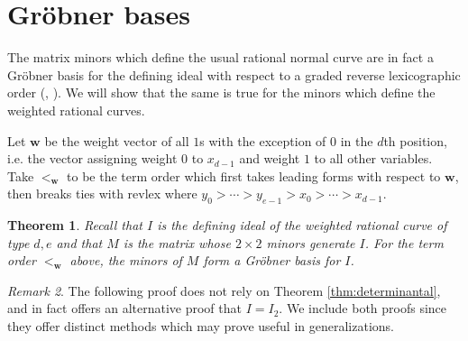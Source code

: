 \documentclass[12pt,reqno]{amsart}
\newtheorem{theorem}{Theorem}[section]
\theoremstyle{definition}
\theoremstyle{remark}
\newtheorem{remark}[theorem]{Remark}
\newcommand{\bfw}{{\mathbf{w}}}
\begin{document}
\section{Gr\"obner bases}\label{sec:GB}

The matrix minors which define the usual rational normal curve are in fact a Gr\"obner basis for the defining ideal with respect to a graded reverse lexicographic order (\cite{sGrobnerBasesConvexPolytopes, eInitialIdealsVeroneseSubrings}, \cite[Theorem~3.1.1]{cdrKoszulAlgRegularity}).  We will show that the same is true for the minors which define the weighted rational curves.

Let $\bfw$ be the weight vector of all $1$s with the exception of $0$ in the $d$th position, i.e. the vector assigning weight $0$ to $x_{d-1}$ and weight $1$ to all other variables. Take $<_\bfw$ to be the term order which first takes leading forms with respect to $\bfw$, then breaks ties with revlex where $y_0 > \cdots > y_{e-1} > x_0 > \cdots > x_{d-1}$. 

\begin{theorem}
\label{thm:GBforI}
Recall that $I$ is the defining ideal of the weighted rational curve of type $d,e$ and that $M$ is the matrix whose $2 \times 2$ minors generate $I$. For the term order $<_\bfw$ above, the minors of $M$ form a Gr\"obner basis for $I$. 
\end{theorem}

\begin{remark}
The following proof does not rely on Theorem \ref{thm:determinantal}, and in fact offers an alternative proof that $I = I_2$.  We include both proofs since they offer distinct methods which may prove useful in generalizations.
\end{remark}
\end{document}
